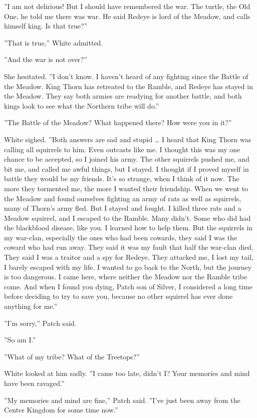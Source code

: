 \documentclass[12pt]{book}
\begin{document}
''I am not delirious! But I should have remembered the war. The
turtle, the Old One, he told me there was war. He said Redeye is lord
of the Meadow, and calls himself king. Is that true?''

''That is true,'' White admitted.

''And the war is not over?''

She hesitated. ''I don't know. I haven't heard of any fighting since
the Battle of the Meadow. King Thorn has retreated to the Ramble, and
Redeye has stayed in the Meadow. They say both armies are readying for
another battle, and both kings look to see what the Northern tribe
will do.''

''The Battle of the Meadow? What happened there? How were you in it?''

White sighed. ''Both answers are sad and stupid \ldots{} I heard that
King Thorn was calling all squirrels to him. Even outcasts like me. I
thought this was my one chance to be accepted, so I joined his
army. The other squirrels pushed me, and bit me, and called me awful
things, but I stayed. I thought if I proved myself in battle they
would be my friends. It's so strange, when I think of it now. The more
they tormented me, the more I wanted their friendship. When we went to
the Meadow and found ourselves fighting an army of rats as well as
squirrels, many of Thorn's army fled. But I stayed and fought. I
killed three rats and a Meadow squirrel, and I escaped to the
Ramble. Many didn't. Some who did had the blackblood disease, like
you. I learned how to help them. But the squirrels in my war-clan,
especially the ones who had been cowards, they said I was the coward
who had run away. They said it was my fault that half the war-clan
died. They said I was a traitor and a spy for Redeye. They attacked
me, I lost my tail, I barely escaped with my life. I wanted to go back
to the North, but the journey is too dangerous. I came here, where
neither the Meadow nor the Ramble tribe come. And when I found you
dying, Patch son of Silver, I considered a long time before deciding
to try to save you, because no other squirrel has ever done anything
for me.''

''I'm sorry,'' Patch said.

''So am I.''

''What of my tribe? What of the Treetops?''

White looked at him sadly. ''I came too late, didn't I? Your memories
and mind have been ravaged.''

''My memories and mind are fine,'' Patch said. ''I've just been away
from the Center Kingdom for some time now.''
\end{document}

